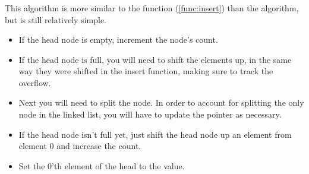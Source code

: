 \subsubsection{}
This algorithm is more similar to the  function (\ref{func:insert}) than the 
algorithm, but is still relatively simple.

\begin{itemize}
	\item If the head node is empty, increment the node's count.
	\item If the head node is full, you will need to shift the elements up, in the
	      same way they were shifted in the insert function, making sure to track the overflow.
	\item Next you will need to split the node.
	      In order to account for splitting the only node in the linked list, you
	      will have to update the  pointer as necessary.
	\item If the head node isn't full yet, just shift the head node up an element
	      from element 0 and increase the count.
	\item Set the 0'th element of the head to the value.
\end{itemize}
